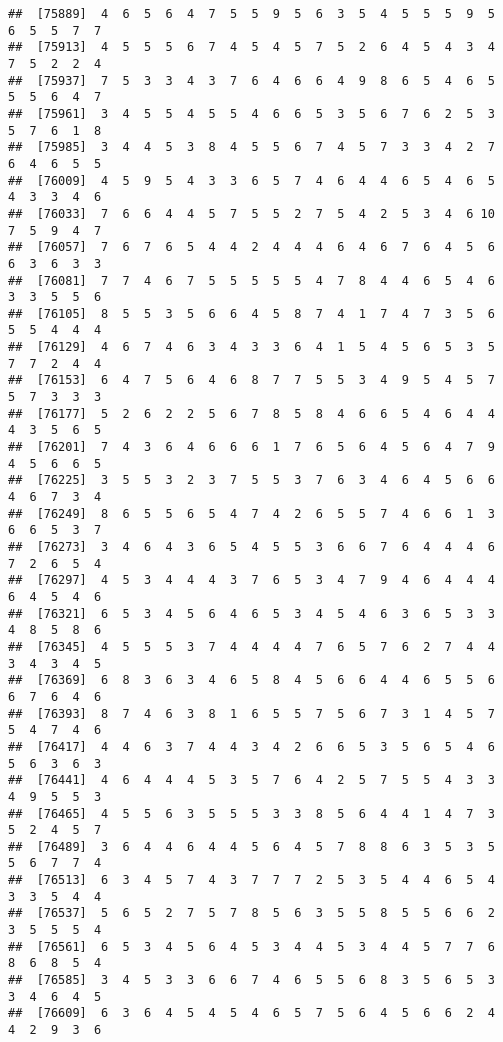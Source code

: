 \documentclass[
]{book}
\begin{document}
\begin{verbatim}
##  [75889]  4  6  5  6  4  7  5  5  9  5  6  3  5  4  5  5  5  9  5  6  5  5  7  7
##  [75913]  4  5  5  5  6  7  4  5  4  5  7  5  2  6  4  5  4  3  4  7  5  2  2  4
##  [75937]  7  5  3  3  4  3  7  6  4  6  6  4  9  8  6  5  4  6  5  5  5  6  4  7
##  [75961]  3  4  5  5  4  5  5  4  6  6  5  3  5  6  7  6  2  5  3  5  7  6  1  8
##  [75985]  3  4  4  5  3  8  4  5  5  6  7  4  5  7  3  3  4  2  7  6  4  6  5  5
##  [76009]  4  5  9  5  4  3  3  6  5  7  4  6  4  4  6  5  4  6  5  4  3  3  4  6
##  [76033]  7  6  6  4  4  5  7  5  5  2  7  5  4  2  5  3  4  6 10  7  5  9  4  7
##  [76057]  7  6  7  6  5  4  4  2  4  4  4  6  4  6  7  6  4  5  6  6  3  6  3  3
##  [76081]  7  7  4  6  7  5  5  5  5  5  4  7  8  4  4  6  5  4  6  3  3  5  5  6
##  [76105]  8  5  5  3  5  6  6  4  5  8  7  4  1  7  4  7  3  5  6  5  5  4  4  4
##  [76129]  4  6  7  4  6  3  4  3  3  6  4  1  5  4  5  6  5  3  5  7  7  2  4  4
##  [76153]  6  4  7  5  6  4  6  8  7  7  5  5  3  4  9  5  4  5  7  5  7  3  3  3
##  [76177]  5  2  6  2  2  5  6  7  8  5  8  4  6  6  5  4  6  4  4  4  3  5  6  5
##  [76201]  7  4  3  6  4  6  6  6  1  7  6  5  6  4  5  6  4  7  9  4  5  6  6  5
##  [76225]  3  5  5  3  2  3  7  5  5  3  7  6  3  4  6  4  5  6  6  4  6  7  3  4
##  [76249]  8  6  5  5  6  5  4  7  4  2  6  5  5  7  4  6  6  1  3  6  6  5  3  7
##  [76273]  3  4  6  4  3  6  5  4  5  5  3  6  6  7  6  4  4  4  6  7  2  6  5  4
##  [76297]  4  5  3  4  4  4  3  7  6  5  3  4  7  9  4  6  4  4  4  6  4  5  4  6
##  [76321]  6  5  3  4  5  6  4  6  5  3  4  5  4  6  3  6  5  3  3  4  8  5  8  6
##  [76345]  4  5  5  5  3  7  4  4  4  4  7  6  5  7  6  2  7  4  4  3  4  3  4  5
##  [76369]  6  8  3  6  3  4  6  5  8  4  5  6  6  4  4  6  5  5  6  6  7  6  4  6
##  [76393]  8  7  4  6  3  8  1  6  5  5  7  5  6  7  3  1  4  5  7  5  4  7  4  6
##  [76417]  4  4  6  3  7  4  4  3  4  2  6  6  5  3  5  6  5  4  6  5  6  3  6  3
##  [76441]  4  6  4  4  4  5  3  5  7  6  4  2  5  7  5  5  4  3  3  4  9  5  5  3
##  [76465]  4  5  5  6  3  5  5  5  3  3  8  5  6  4  4  1  4  7  3  5  2  4  5  7
##  [76489]  3  6  4  4  6  4  4  5  6  4  5  7  8  8  6  3  5  3  5  5  6  7  7  4
##  [76513]  6  3  4  5  7  4  3  7  7  7  2  5  3  5  4  4  6  5  4  3  3  5  4  4
##  [76537]  5  6  5  2  7  5  7  8  5  6  3  5  5  8  5  5  6  6  2  3  5  5  5  4
##  [76561]  6  5  3  4  5  6  4  5  3  4  4  5  3  4  4  5  7  7  6  8  6  8  5  4
##  [76585]  3  4  5  3  3  6  6  7  4  6  5  5  6  8  3  5  6  5  3  3  4  6  4  5
##  [76609]  6  3  6  4  5  4  5  4  6  5  7  5  6  4  5  6  6  2  4  4  2  9  3  6

\end{verbatim}
\end{document}
